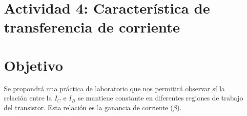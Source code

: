 \newpage

\section{Actividad 4: Característica de transferencia de corriente}

\section*{Objetivo}
Se propondrá una práctica de laboratorio que nos permitirá observar sí la relación
entre la $I_C$ e $I_B$ se mantiene constante en diferentes regiones de trabajo del transistor. Esta
relación es la ganancia de corriente ($\beta$).


\begin{table}[ht]
\end{table}
